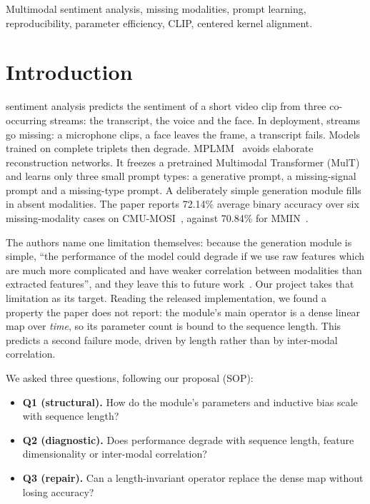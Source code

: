 \documentclass[lettersize,journal]{IEEEtran}
\begin{document}
\begin{IEEEkeywords}
Multimodal sentiment analysis, missing modalities, prompt learning, reproducibility, parameter efficiency, CLIP, centered kernel alignment.
\end{IEEEkeywords}

\section{Introduction}
 sentiment analysis predicts the sentiment of a short video clip from three co-occurring streams: the transcript, the voice and the face. In deployment, streams go missing: a microphone clips, a face leaves the frame, a transcript fails. Models trained on complete triplets then degrade. MPLMM~\cite{guo2024mplmm} avoids elaborate reconstruction networks. It freezes a pretrained Multimodal Transformer (MulT)~\cite{tsai2019mult} and learns only three small prompt types: a generative prompt, a missing-signal prompt and a missing-type prompt. A deliberately simple generation module fills in absent modalities. The paper reports 72.14\% average binary accuracy over six missing-modality cases on CMU-MOSI~\cite{zadeh2016mosi}, against 70.84\% for MMIN~\cite{zhao2021mmin}.

The authors name one limitation themselves: because the generation module is simple, ``the performance of the model could degrade if we use raw features which are much more complicated and have weaker correlation between modalities than extracted features'', and they leave this to future work~\cite{guo2024mplmm}. Our project takes that limitation as its target. Reading the released implementation, we found a property the paper does not report: the module's main operator is a dense linear map over \emph{time}, so its parameter count is bound to the sequence length. This predicts a second failure mode, driven by length rather than by inter-modal correlation.

We asked three questions, following our proposal (SOP):
\begin{itemize}
\item \textbf{Q1 (structural).} How do the module's parameters and inductive bias scale with sequence length?
\item \textbf{Q2 (diagnostic).} Does performance degrade with sequence length, feature dimensionality or inter-modal correlation?
\item \textbf{Q3 (repair).} Can a length-invariant operator replace the dense map without losing accuracy?
\end{itemize}
\end{document}
